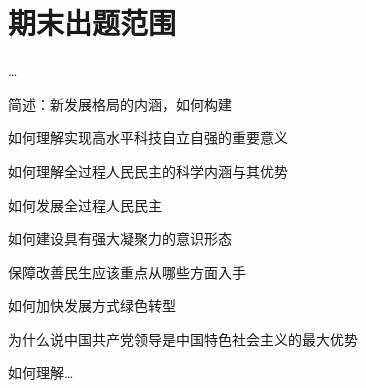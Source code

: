 \section*{期末出题范围}%
\label{sec*:期末出题范围}
\ldots 

简述：新发展格局的内涵，如何构建

如何理解实现高水平科技自立自强的重要意义

如何理解全过程人民民主的科学内涵与其优势

如何发展全过程人民民主

如何建设具有强大凝聚力的意识形态

保障改善民生应该重点从哪些方面入手

如何加快发展方式绿色转型

为什么说中国共产党领导是中国特色社会主义的最大优势

如何理解\ldots


